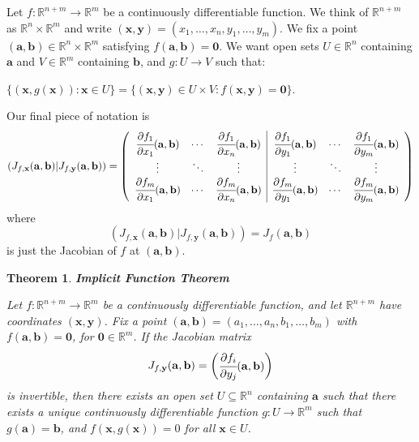 \documentclass[12pt]{article}
\newcommand{\real}{\mathbb{R}}
\newcommand\set[1]{\{#1\}}
\newtheorem{thm}{Theorem}[section]
\begin{document}
\begin{indent}
  Let $f: \real^{n+m} \to \real^m$ be a continuously differentiable function. We think of $\real^{n+m}$ as $\real^n \times \real^m$ and write $(\mathbf{x},\mathbf{y}) = (x_1, \dots, x_n, y_1, \dots, y_m)$. We fix a point
  $(\mathbf{a}, \mathbf{b}) \in \real^n \times \real^m$ satisfying $f(\mathbf{a},\mathbf{b})=\mathbf{0}$. We want open sets $U \in \real^n$ containing $\mathbf{a}$ and $V \in \real^m$ containing $\mathbf{b}$, and $g: U \to V$ such that:
  \begin{center}
    $\set{(\mathbf{x}, g(\mathbf{x})) : \mathbf{x} \in U} = \set{(\mathbf{x}, \mathbf{y}) \in U \times V :  f(\mathbf{x}, \mathbf{y}) = \mathbf{0}}$.
  \end{center}
  Our final piece of notation is
  \begin{equation*}
    (J_{f,\mathbf{x}}(\mathbf{a}, \mathbf{b}) \vert J_{f,\mathbf{y}}(\mathbf{a},\mathbf{b}))= 
    \begingroup
    \left(
    \begin{array}{ccc|ccc}
      \cfrac{\partial f_1}{\partial x_1}(\mathbf{a},\mathbf{b}) & \cdots & \cfrac{\partial f_1}{\partial x_n}(\mathbf{a},\mathbf{b}) & \cfrac{\partial f_1}{\partial y_1}(\mathbf{a},\mathbf{b}) & \cdots & \cfrac{\partial f_1}{\partial y_m}(\mathbf{a},\mathbf{b}) \\
      \vdots & \ddots & \vdots                                     & \vdots & \ddots & \vdots\\
      \cfrac{\partial f_m}{\partial x_1}(\mathbf{a},\mathbf{b}) & \cdots & \cfrac{\partial f_m}{\partial x_n}(\mathbf{a},\mathbf{b}) &  \cfrac{\partial f_m}{\partial y_1}(\mathbf{a},\mathbf{b}) & \cdots & \cfrac{\partial f_m}{\partial y_m}(\mathbf{a},\mathbf{b})
    \end{array}
    \right)
    \endgroup
  \end{equation*}
  where
  \begin{equation*}
        (J_{f,\mathbf{x}}(\mathbf{a}, \mathbf{b}) \vert J_{f,\mathbf{y}}(\mathbf{a},\mathbf{b}))= J_f(\mathbf{a}, \mathbf{b})
  \end{equation*}
  is just the Jacobian of $f$ at $(\mathbf{a}, \mathbf{b})$.
\end{indent}
\begin{thm}{\textbf{Implicit Function Theorem}}

  Let $f : \real^{n+m} \to \real^m$ be a continuously differentiable function, and let  $\real^{n+m}$ have coordinates $(\mathbf{x}, \mathbf{y})$. Fix a point $(\mathbf{a},\mathbf{b})=(a_1,\dots,a_n,b_1,\dots,b_m)$ with
  $f(\mathbf{a},\mathbf{b}) = \mathbf{0}$, for $\mathbf{0} \in \real^m$. If the Jacobian matrix
  \begin{equation*}
    J_{f,\mathbf{y}}(\mathbf{a},\mathbf{b}) =
    \begin{pmatrix}
      \cfrac{\partial f_i}{\partial y_j}(\mathbf{a}, \mathbf{b})
    \end{pmatrix}
  \end{equation*}
  is invertible, then there exists an open set $U \subseteq \real^n$ containing $\textbf{a}$ such that there exists a unique continuously differentiable function $g: U \to \real^m$ such that $g(\mathbf{a}) = \mathbf{b}$, and  $f(\mathbf{x},g(\mathbf{x})) = 0$ for all $\mathbf{x} \in U$.
\end{thm}
\end{document}
